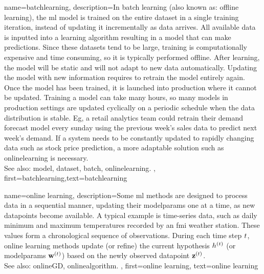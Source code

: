 {name={batchlearning},
description={In batch learning (also known as: offline learning), the \gls{ml} \gls{model} is trained on the entire \gls{dataset} in a single training iteration, instead of updating it incrementally as \gls{data} arrives. All available \gls{data} is inputted into a learning \gls{algorithm} resulting in a \gls{model} that can make predictions. Since these \glspl{dataset} tend to be large,
training is computationally expensive and time consuming, so it is typically performed offline. After learning, the \gls{model} will be static and will not adapt to new \gls{data} automatically. Updating the \gls{model} with new information requires to retrain the \gls{model} entirely again. Once the model has been trained, it is launched into production where it cannot be updated. 
Training a model can take many hours, so many models in production settings are updated cyclically on a periodic schedule when the data distribution is stable. Eg, a retail analytics team could retrain their demand forecast model every sunday using the previous week's sales data to predict next week's demand. 
If a system needs to be constantly updated to rapidly changing data such as stock price prediction, a more adaptable solution such as \gls{onlinelearning} is necessary.\\
See also: \gls{model}, \gls{dataset}, \gls{batch}, \gls{onlinelearning}. },
	first={batchlearning},text={batchlearning}
} 

{name={online learning},
	description={Some \gls{ml} methods  are designed to process \gls{data} in a sequential 
		manner, updating their \gls{modelparams} one at a time, as new \glspl{datapoint} become available. 
		A typical example is time-series \gls{data}, such as daily \gls{minimum} and \gls{maximum} temperatures 
		recorded by an \gls{fmi} weather station. These values form a chronological sequence 
		of observations. During each time step $t$, online learning methods update (or refine)  
		the current \gls{hypothesis} $h^{(t)}$ (or \gls{modelparams} ${\bf w}^{(t)}$) 
		based on the newly observed \gls{datapoint} ${\bf z}^{(t)}$. 
		\\ 
		See also: \gls{onlineGD}, \gls{onlinealgorithm}. },
	first={online learning},
	text={online learning} 
}

